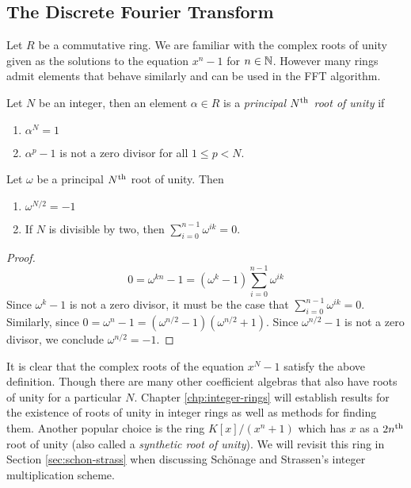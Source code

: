 \subsection{The Discrete Fourier Transform}

Let $R$ be a commutative ring. We are familiar with the complex roots of unity given as the solutions to the equation $x^n - 1$ for $n \in {\mathbb N}$. However many rings admit elements that behave similarly and can be used in the FFT algorithm. 

\begin{definition}
  Let $N$ be an integer, then an element $\alpha \in R$ is a \emph{principal $N^{\textrm{th}}$ root of unity} if
  \begin{enumerate}
    \item $\alpha^N = 1$
    \item $\alpha^p - 1$ is not a zero divisor for all $1 \leq p < N$.
  \end{enumerate}
\end{definition}

\begin{lemma}\label{lem:rou-results}
    Let $\omega$ be a principal $N^{\textrm{th}}$ root of unity. Then 
    \begin{enumerate}
        \item $\omega^{N/2} = -1$
        \item If $N$ is divisible by two, then $\sum_{i = 0}^{n-1} \omega^{ik} = 0$.
    \end{enumerate}
\end{lemma}
\begin{proof}
    \[
        0 = \omega^{kn} - 1 = (\omega^k - 1)\sum^{n-1}_{i=0} \omega^{ik}
    \]
    Since $\omega^k - 1$ is not a zero divisor, it must be the case that $\sum^{n-1}_{i=0} \omega^{ik} = 0$.
    Similarly, since $0 = \omega^n - 1 = (\omega^{n/2} - 1)(\omega^{n/2} + 1)$. Since $\omega^{n/2} - 1$ is not a zero divisor, we conclude $\omega^{n/2} = -1$.
\end{proof}

It is clear that the complex roots of the equation $x^N - 1$ satisfy the above definition. Though there are many other coefficient algebras that also have roots of unity for a particular $N$. Chapter \ref{chp:integer-rings} will establish results for the existence of roots of unity in integer rings as well as methods for finding them. Another popular choice is the ring $K[x]/(x^n + 1)$ which has $x$ as a $2n^{\textrm{th}}$ root of unity (also called a \textit{synthetic root of unity}). We will revisit this ring in Section \ref{sec:schon-strass} when discussing Sch\"{o}nage and Strassen's integer multiplication scheme. 


